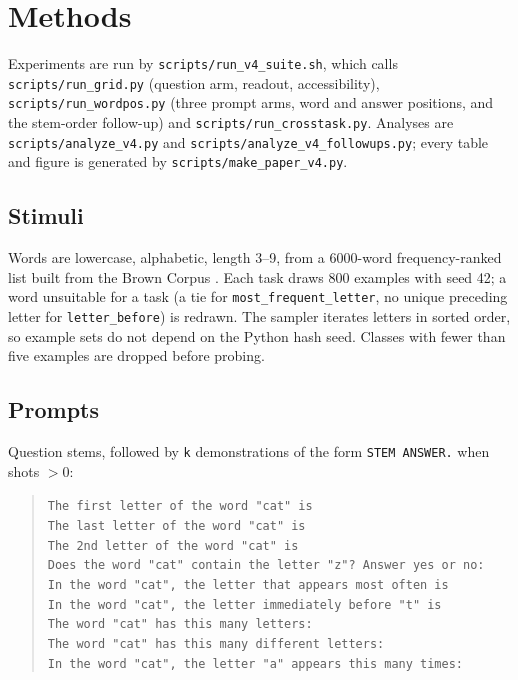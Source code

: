 \section{Methods}
\label{app:methods}

Experiments are run by \texttt{scripts/run\_v4\_suite.sh}, which calls \texttt{scripts/run\_grid.py}
(question arm, readout, accessibility), \texttt{scripts/run\_wordpos.py} (three prompt arms, word and
answer positions, and the stem-order follow-up) and \texttt{scripts/run\_crosstask.py}. Analyses are
\texttt{scripts/analyze\_v4.py} and \texttt{scripts/analyze\_v4\_followups.py}; every table and figure
is generated by \texttt{scripts/make\_paper\_v4.py}.

\subsection{Stimuli}
\label{app:data}
Words are lowercase, alphabetic, length 3--9, from a 6000-word frequency-ranked list built from the
Brown Corpus \citep{kucera1967brown}. Each task draws 800 examples with seed 42; a word unsuitable for
a task (a tie for \texttt{most\_frequent\_letter}, no unique preceding letter for
\texttt{letter\_before}) is redrawn. The sampler iterates letters in sorted order, so example sets do
not depend on the Python hash seed. Classes with fewer than five examples are dropped before probing.

\subsection{Prompts}
\label{app:prompts}
Question stems, followed by \texttt{k} demonstrations of the form \texttt{STEM ANSWER.} when shots $>0$:

\begingroup\sloppy
\begin{quote}\footnotesize
\texttt{The first letter of the word "cat" is}\\
\texttt{The last letter of the word "cat" is}\\
\texttt{The 2nd letter of the word "cat" is}\\
\texttt{Does the word "cat" contain the letter "z"? Answer yes or no:}\\
\texttt{In the word "cat", the letter that appears most often is}\\
\texttt{In the word "cat", the letter immediately before "t" is}\\
\texttt{The word "cat" has this many letters:}\\
\texttt{The word "cat" has this many different letters:}\\
\texttt{In the word "cat", the letter "a" appears this many times:}
\end{quote}
\endgroup


